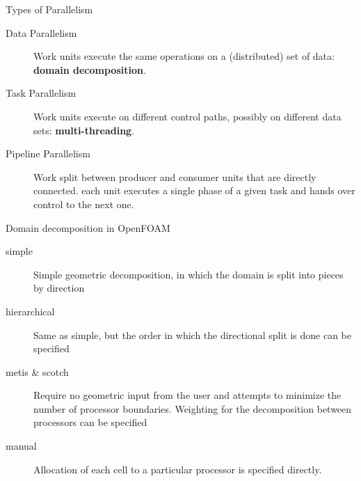 \begin{frame}[fragile]{Types of Parallelism}
    \begin{description}
        \item[Data Parallelism  \hspace{0.4cm}] \hspace{\linewidth} Work units execute the same operations on a (distributed) set of data: {\bf domain decomposition}.
        \pause
        \item[\alert{Task Parallelism} \hspace{0.4cm}] \hspace{\linewidth} Work units execute on different control paths, possibly on different data sets: {\bf multi-threading}.
        \item[\alert{Pipeline Parallelism}] \hspace{\linewidth} Work split between producer and consumer units that are directly connected. each unit executes a single
            phase of a given task and hands over control to the next one.
    \end{description}
\end{frame}


\begin{frame}[fragile]{Domain decomposition in OpenFOAM}
\begin{description}
    \item[simple\hspace{2cm}] \hspace{\linewidth} 
        Simple geometric decomposition, in which the domain is split into pieces by direction
    \item[hierarchical\hspace{2cm}] \hspace{\linewidth} 
        Same as simple, but the order in which the directional split is done can be specified
    \item[metis \& scotch\hspace{2cm}] \hspace{\linewidth} 
        Require no geometric input from the user and attempts to minimize the number of processor boundaries.
        Weighting for the decomposition between processors can be specified
    \item[manual\hspace{2cm}] \hspace{\linewidth} 
        Allocation of each cell to a particular processor is specified directly.
\end{description}
\end{frame}


